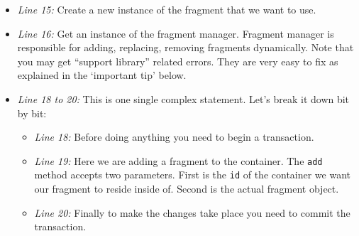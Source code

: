 \begin{itemize}
	\item \textit{Line 15:} Create a new instance of the fragment that we want to use.
	\item \textit{Line 16:} Get an instance of the fragment manager. Fragment manager is responsible for adding, replacing, removing fragments dynamically. Note that you may get ``support library'' related errors. They are very easy to fix as explained in the `important tip' below.
	\item \textit{Line 18 to 20:} This is one single complex statement. Let's break it down bit by bit:
	\begin{itemize}
		\item \textit{Line 18:} Before doing anything you need to begin a transaction.
		
		\item \textit{Line 19:} Here we are adding a fragment to the container. The \texttt{add} method accepts two parameters. First is the \texttt{id} of the container we want our fragment to reside inside of. Second is the actual fragment object.
		\item \textit{Line 20:} Finally to make the changes take place you need to commit the transaction.
	\end{itemize}
\end{itemize}

